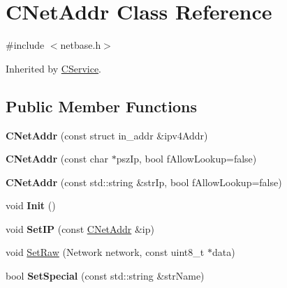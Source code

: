 \hypertarget{class_c_net_addr}{}\section{C\+Net\+Addr Class Reference}
\label{class_c_net_addr}


{\ttfamily \#include $<$netbase.\+h$>$}



Inherited by \mbox{\hyperlink{class_c_service}{C\+Service}}.

\subsection*{Public Member Functions}
\begin{DoxyCompactItemize}
\item 
\mbox{\label{class_c_net_addr_a0af492cd8aca9bbaa3392cdbfbb55681}} 
{\bfseries C\+Net\+Addr} (const struct in\+\_\+addr \&ipv4\+Addr)
\item 
\mbox{\label{class_c_net_addr_a3549332f92d95ccadf262bdce9f4eacf}} 
{\bfseries C\+Net\+Addr} (const char $\ast$psz\+Ip, bool f\+Allow\+Lookup=false)
\item 
\mbox{\label{class_c_net_addr_ae237602be0e4bce6ff31061270371144}} 
{\bfseries C\+Net\+Addr} (const std\+::string \&str\+Ip, bool f\+Allow\+Lookup=false)
\item 
\mbox{\label{class_c_net_addr_adab412fbc5a9203bea90ae173996ab10}} 
void {\bfseries Init} ()
\item 
\mbox{\label{class_c_net_addr_a1c6087345e5ca07a151451cd6deb974f}} 
void {\bfseries Set\+IP} (const \mbox{\hyperlink{class_c_net_addr}{C\+Net\+Addr}} \&ip)
\item 
void \mbox{\hyperlink{class_c_net_addr_a1f0b23aca4ca78c11735d13f3583b7ad}{Set\+Raw}} (Network network, const uint8\+\_\+t $\ast$data)
\item 
\mbox{\label{class_c_net_addr_aa3e44dfd064d9d8da1cb48cdcb7dd231}} 
bool {\bfseries Set\+Special} (const std\+::string \&str\+Name)
\item 
\mbox{\label{class_c_net_addr_a7021b79e9a33c342b68db09dbb6c2293}} 

\end{DoxyCompactItemize}

